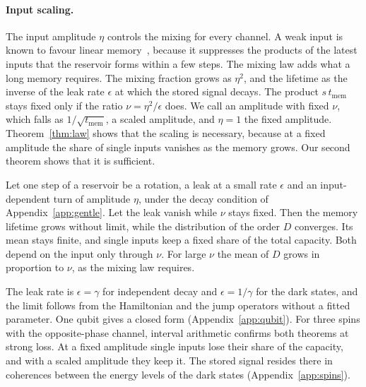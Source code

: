 \paragraph{Input scaling.}
The input amplitude $\eta$ controls the mixing for every channel. A weak input is known to favour linear
memory~\cite{Jaeger2007Leaky,Inubushi2017,Cindrak2026}, because it suppresses the products of the latest inputs that
the reservoir forms within a few steps. The mixing law adds what a long memory requires. The mixing fraction grows
as $\eta^2$, and the lifetime as the inverse of the leak rate $\epsilon$ at which the stored signal decays. The
product $s\,t_{\mathrm{mem}}$ stays fixed only if the ratio $\nu=\eta^2/\epsilon$ does. We call an amplitude with fixed $\nu$, which falls as $1/\sqrt{t_{\mathrm{mem}}}$, a scaled amplitude, and
$\eta=1$ the fixed amplitude. Theorem~\ref{thm:law} shows that the scaling is necessary, because at a fixed amplitude
the share of single inputs vanishes as the memory grows. Our second theorem shows that it is sufficient.

\begin{keybox}
\begin{theorem}\label{thm:gentle}
Let one step of a reservoir be a rotation, a leak at a small rate $\epsilon$ and an input-dependent turn of amplitude
$\eta$, under the decay condition of Appendix~\ref{app:gentle}. Let the leak vanish while $\nu$ stays fixed. Then the
memory lifetime grows without limit, while the distribution of the order $D$ converges. Its mean stays finite, and
single inputs keep a fixed share of the total capacity. Both depend on the input only through $\nu$. For large $\nu$
the mean of $D$ grows in proportion to $\nu$, as the mixing law requires.
\end{theorem}
\end{keybox}

The leak rate is $\epsilon=\gamma$ for independent decay and $\epsilon=1/\gamma$ for the dark states, and the limit
follows from the Hamiltonian and the jump operators without a fitted parameter. One qubit gives a closed form
(Appendix~\ref{app:qubit}). For three spins with the opposite-phase channel, interval arithmetic confirms both
theorems at strong loss. At a fixed amplitude single inputs lose their share of the capacity, and with a scaled
amplitude they keep it. The stored signal resides there in coherences between the energy levels of the dark states
(Appendix~\ref{app:spins}).

